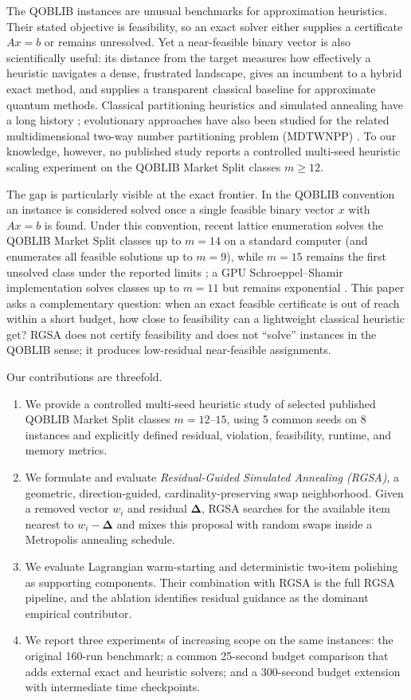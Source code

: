 \documentclass[11pt]{article}
\newcommand{\res}{\boldsymbol{\Delta}}
\begin{document}
The QOBLIB instances are unusual benchmarks for approximation heuristics. Their stated objective is feasibility, so an exact solver either supplies a certificate $Ax=b$ or remains unresolved. Yet a near-feasible binary vector is also scientifically useful: its distance from the target measures how effectively a heuristic navigates a dense, frustrated landscape, gives an incumbent to a hybrid exact method, and supplies a transparent classical baseline for approximate quantum methods. Classical partitioning heuristics and simulated annealing have a long history \cite{kirkpatrick1983,johnson1991,mertens1999}; evolutionary approaches have also been studied for the related multidimensional two-way number partitioning problem (MDTWNPP) \cite{kojic2010,santucci2021}. To our knowledge, however, no published study reports a controlled multi-seed heuristic scaling experiment on the QOBLIB Market Split classes $m\geq12$.

The gap is particularly visible at the exact frontier. In the QOBLIB convention an instance is considered solved once a single feasible binary vector $x$ with $Ax=b$ is found. Under this convention, recent lattice enumeration solves the QOBLIB Market Split classes up to $m=14$ on a standard computer (and enumerates all feasible solutions up to $m=9$), while $m=15$ remains the first unsolved class under the reported limits \cite{wassermann2026}; a GPU Schroeppel--Shamir implementation solves classes up to $m=11$ but remains exponential \cite{kempkekoch2026}. This paper asks a complementary question: when an exact feasible certificate is out of reach within a short budget, how close to feasibility can a lightweight classical heuristic get? RGSA does not certify feasibility and does not ``solve'' instances in the QOBLIB sense; it produces low-residual near-feasible assignments.

Our contributions are threefold.
\begin{enumerate}
  \item We provide a controlled multi-seed heuristic study of selected published QOBLIB Market Split classes $m=12$--$15$, using 5 common seeds on 8 instances and explicitly defined residual, violation, feasibility, runtime, and memory metrics.
  \item We formulate and evaluate \emph{Residual-Guided Simulated Annealing (RGSA)}, a geometric, direction-guided, cardinality-preserving swap neighborhood. Given a removed vector $w_i$ and residual $\res$, RGSA searches for the available item nearest to $w_i-\res$ and mixes this proposal with random swaps inside a Metropolis annealing schedule.
  \item We evaluate Lagrangian warm-starting and deterministic two-item polishing as supporting components. Their combination with RGSA is the full RGSA pipeline, and the ablation identifies residual guidance as the dominant empirical contributor.
  \item We report three experiments of increasing scope on the same instances: the original 160-run benchmark; a common 25-second budget comparison that adds external exact and heuristic solvers; and a 300-second budget extension with intermediate time checkpoints.
\end{enumerate}
\end{document}
